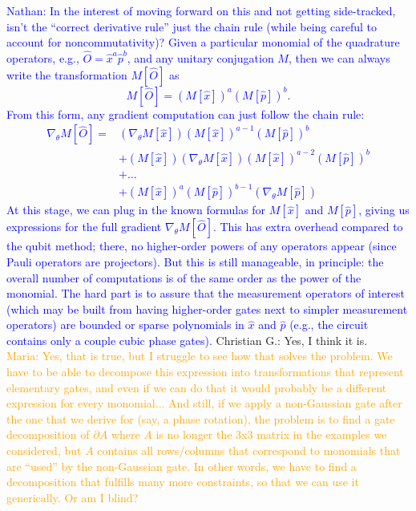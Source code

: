 \documentclass[aps,pra,10pt,onecolumn,notitlepage, groupedaddress,nofootinbib]{revtex4-1}
\theoremstyle{plain}
\newcommand{\nathan}[1]{\textcolor{blue}{Nathan: #1}}
\newcommand{\maria}[1]{\textcolor{orange}{Maria: #1}}
\newcommand{\cg}[1]{\textcolor{cyan!80!black}{Christian G.: #1}}
\begin{document}
\nathan{In the interest of moving forward on this and not getting side-tracked, isn't the ``correct derivative rule'' just the chain rule (while being careful to account for noncommutativity)? Given a particular monomial of the quadrature operators, e.g., $\hat{O}=\hat{x}^a\hat{p}^b$, and any unitary conjugation $M$, then we can always write the transformation $M[\hat{O}]$ as
\begin{equation}
 M[\hat{O}] = \left(M[\hat{x}]\right)^a \left(M[\hat{p}]\right)^b.
\end{equation}
From this form, any gradient computation can just follow the chain rule:
\begin{align*}
 \nabla_\theta M[\hat{O}]
 = &\left(\nabla_\theta M[\hat{x}]\right) \left(M[\hat{x}]\right)^{a-1}\left(M[\hat{p}]\right)^b \\
   & + \left(M[\hat{x}]\right)\left(\nabla_\theta M[\hat{x}]\right)\left(M[\hat{x}]\right)^{a-2} \left(M[\hat{p}]\right)^b \\
   & + \dots \\
   & +  \left(M[\hat{x}]\right)^a \left(M[\hat{p}]\right)^{b-1}\left(\nabla_\theta M[\hat{p}]\right)
\end{align*}
At this stage, we can plug in the known formulas for $M[\hat{x}]$ and $M[\hat{p}]$, giving us expressions for the full gradient $\nabla_\theta M[\hat{O}]$. This has extra overhead compared to the qubit method; there, no higher-order powers of any operators appear (since Pauli operators are projectors). But this is still manageable, in principle: the overall number of computations is of the same order as the power of the monomial. The hard part is to assure that the measurement operators of interest (which may be built from having higher-order gates next to simpler measurement operators) are bounded or sparse polynomials in $\hat{x}$ and $\hat{p}$ (e.g., the circuit contains only a couple cubic phase gates).
}
\cg{Yes, I think it is.}\\
\maria{Yes, that is true, but I struggle to see how that solves the problem. We have to be able to decompose this expression into transformations that represent elementary gates, and even if we can do that it would probably be a different expression for every monomial...
And still, if we apply a non-Gaussian gate after the one that we derive for (say, a phase rotation), the problem is to find a gate decomposition of $\partial A$ where $A$ is no longer the 3x3 matrix in the examples we considered, but $A$ contains all rows/columns that correspond to monomials that are ``used'' by the non-Gaussian gate. In other words, we have to find a decomposition that fulfills many more constraints, so that we can use it generically. Or am I blind?}
\end{document}
